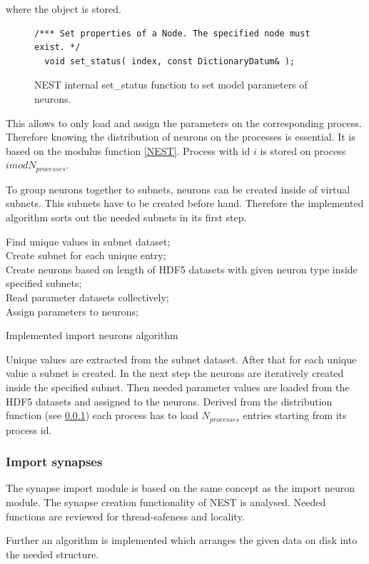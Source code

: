 where the object is stored.
\begin{figure}[ht!]
\begin{lstlisting}[style=cppcode]
/*** Set properties of a Node. The specified node must exist. */
  void set_status( index, const DictionaryDatum& );
\end{lstlisting}
\caption{NEST internal set\_{}status function to set model parameters of neurons.}
\label{code:setstatus}
\end{figure}
This allows to only load and assign the parameters on the corresponding process.
Therefore knowing the distribution of neurons on the processes is essential.
It is based on the modulus function \ref{NEST}.
Process with id $i$ is stored on process $i mod N_{processes}$.

To group neurons together to subnets, neurons can be created inside of virtual subnets.
This subnets have to be created before hand.
Therefore the implemented algorithm sorts out the needed subnets in its first step.
\begin{algorithm}
 Find unique values in subnet dataset; \\
 Create subnet for each unique entry; \\
 Create neurons based on length of HDF5 datasets with given neuron type inside specified subnets; \\
 Read parameter datasets collectively; \\
 Assign parameters to neurons;
\label{alg2}
\caption{Implemented import neurons algorithm}
\end{algorithm}
Unique values are extracted from the subnet dataset.
After that for each unique value a subnet is created.
In the next step the neurons are iteratively created inside the specified subnet.
Then needed parameter values are loaded from the HDF5 datasets and assigned to the neurons.
Derived from the distribution function (see \ref{}) each process has to load $N_{processes}$
entries starting from its process id.

\newpage
\subsubsection{Import synapses}
The synapse import module is based on the same concept as the import neuron module.
The synapse creation functionality of NEST is analysed.
Needed functions are reviewed for thread-safeness and locality.

Further an algorithm is implemented which arranges the given data on disk into
the needed structure.

